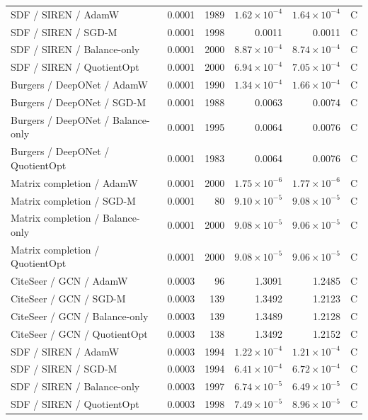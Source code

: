 \begin{longtable}{p{.34\linewidth}p{.09\linewidth}rrrr}
SDF / SIREN / AdamW & 0.0001 & 1989 & $1.62\!\times\!10^{-4}$ & $1.64\!\times\!10^{-4}$ & C\\
SDF / SIREN / SGD-M & 0.0001 & 1998 & 0.0011 & 0.0011 & C\\
SDF / SIREN / Balance-only & 0.0001 & 2000 & $8.87\!\times\!10^{-4}$ & $8.74\!\times\!10^{-4}$ & C\\
\rowcolor{oursbg}SDF / SIREN / QuotientOpt & 0.0001 & 2000 & $6.94\!\times\!10^{-4}$ & $7.05\!\times\!10^{-4}$ & C\\
Burgers / DeepONet / AdamW & 0.0001 & 1990 & $1.34\!\times\!10^{-4}$ & $1.66\!\times\!10^{-4}$ & C\\
Burgers / DeepONet / SGD-M & 0.0001 & 1988 & 0.0063 & 0.0074 & C\\
Burgers / DeepONet / Balance-only & 0.0001 & 1995 & 0.0064 & 0.0076 & C\\
\rowcolor{oursbg}Burgers / DeepONet / QuotientOpt & 0.0001 & 1983 & 0.0064 & 0.0076 & C\\
Matrix completion / AdamW & 0.0001 & 2000 & $1.75\!\times\!10^{-6}$ & $1.77\!\times\!10^{-6}$ & C\\
Matrix completion / SGD-M & 0.0001 & 80 & $9.10\!\times\!10^{-5}$ & $9.08\!\times\!10^{-5}$ & C\\
Matrix completion / Balance-only & 0.0001 & 2000 & $9.08\!\times\!10^{-5}$ & $9.06\!\times\!10^{-5}$ & C\\
\rowcolor{oursbg}Matrix completion / QuotientOpt & 0.0001 & 2000 & $9.08\!\times\!10^{-5}$ & $9.06\!\times\!10^{-5}$ & C\\
CiteSeer / GCN / AdamW & 0.0003 & 96 & 1.3091 & 1.2485 & C\\
CiteSeer / GCN / SGD-M & 0.0003 & 139 & 1.3492 & 1.2123 & C\\
CiteSeer / GCN / Balance-only & 0.0003 & 139 & 1.3489 & 1.2128 & C\\
\rowcolor{oursbg}CiteSeer / GCN / QuotientOpt & 0.0003 & 138 & 1.3492 & 1.2152 & C\\
SDF / SIREN / AdamW & 0.0003 & 1994 & $1.22\!\times\!10^{-4}$ & $1.21\!\times\!10^{-4}$ & C\\
SDF / SIREN / SGD-M & 0.0003 & 1994 & $6.41\!\times\!10^{-4}$ & $6.72\!\times\!10^{-4}$ & C\\
SDF / SIREN / Balance-only & 0.0003 & 1997 & $6.74\!\times\!10^{-5}$ & $6.49\!\times\!10^{-5}$ & C\\
\rowcolor{oursbg}SDF / SIREN / QuotientOpt & 0.0003 & 1998 & $7.49\!\times\!10^{-5}$ & $8.96\!\times\!10^{-5}$ & C\\

\end{longtable}
